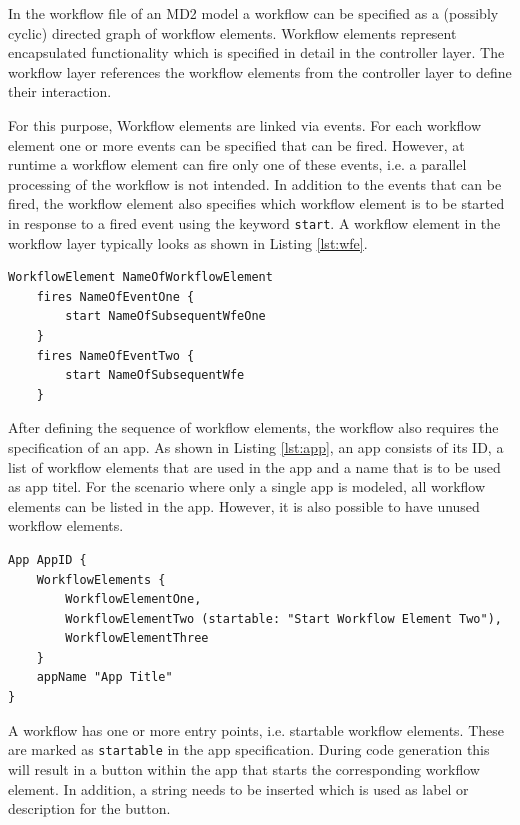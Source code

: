 In the workflow file of an MD2 model a workflow can be specified as a (possibly cyclic) directed graph of workflow elements. Workflow elements represent encapsulated functionality which is specified in detail in the controller layer. The workflow layer references the workflow elements from the controller layer to define their interaction.

For this purpose, Workflow elements are linked via events. For each workflow element one or more events can be specified that can be fired. However, at runtime a workflow element can fire only one of these events, i.e. a parallel processing of the workflow is not intended. In addition to the events that can be fired, the workflow element also specifies which workflow element is to be started in response to a fired event using the keyword {\lstinline!start!}.
A workflow element in the workflow layer typically looks as shown in Listing \ref{lst:wfe}.

\begin{lstlisting}[language=MD2, label=lst:wfe, caption=Workflow Elements in the Workflow Layer]
 WorkflowElement NameOfWorkflowElement
 	fires NameOfEventOne {
		start NameOfSubsequentWfeOne
	}
	fires NameOfEventTwo {
		start NameOfSubsequentWfe
	}
\end{lstlisting}

After defining the sequence of workflow elements, the workflow also requires the specification of an app. As shown in Listing \ref{lst:app}, an app consists of its ID, a list of workflow elements that are used in the app and a name that is to be used as app titel. For the scenario where only a single app is modeled, all workflow elements can be listed in the app. However, it is also possible to have unused workflow elements.

\begin{lstlisting}[language=MD2, label=lst:app, caption=App Definition in MD2]
App AppID {
	WorkflowElements {
		WorkflowElementOne,
		WorkflowElementTwo (startable: "Start Workflow Element Two"),
		WorkflowElementThree 
	}
	appName "App Title"
}
\end{lstlisting}

A workflow has one or more entry points, i.e. startable workflow elements. These are marked as {\lstinline!startable!} in the app specification. During code generation this will result in a button within the app that starts the corresponding workflow element. In addition, a string needs to be inserted which is used as label or description for the button.

